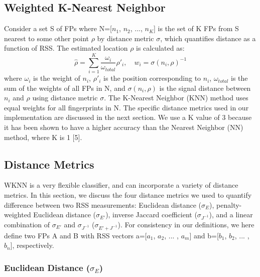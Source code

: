 \documentclass[conference]{IEEEtran}
\begin{document}
\subsection{Weighted K-Nearest Neighbor}
\indent Consider a set S of FPs  where N=[$n_1$, $n_2$, ..., $n_K$] is the set of K FPs from S nearest to some other point $\rho$ by distance metric $\sigma$, which quantifies distance as a function of RSS. The estimated location $\rho$ is calculated as:
\begin{equation}
\label{wknn}
\hat{\rho} = \sum\limits_{i=1}^{K}\frac{\omega_i}{\omega_{total}}\rho'_i, \quad w_i = \sigma(n_i, \rho)^{-1}
\end{equation}
where $\omega_i$ is the weight of $n_i$, $\rho'_i$ is the position corresponding to $n_i$, $\omega_{total}$ is the sum of the weights of all FPs in N, and $\sigma(n_i, \rho)$ is the signal distance between $n_i$ and $\rho$ using distance metric $\sigma$. The K-Nearest Neighbor (KNN) method uses equal weights for all fingerprints in N. The specific distance metrics used in our implementation are discussed in the next section. We use a K value of 3 because it has been shown to have a higher accuracy than the Nearest Neighbor (NN) method, where K is 1 [5]. 

\subsection{Distance Metrics}
WKNN is a very flexible classifier, and can incorporate a variety of distance metrics. In this section, we discuss the four distance metrics we used to quantify difference between two RSS measurements: Euclidean distance ($\sigma_E$), penalty-weighted Euclidean distance ($\sigma_{E'}$), inverse Jaccard coefficient ($\sigma_{J^{-1}}$), and a linear combination of $\sigma_{E'}$ and $\sigma_{J^{-1}}$ ($\sigma_{E' + J^{-1}}$). For consistency in our definitions, we here define two FPs A and B with RSS vectors a=[$a_1$, $a_2$, ... , $a_m$] and b=[$b_1$, $b_2$, ... , $b_n$], respectively. 

\subsubsection{Euclidean Distance ($\sigma_E$)}
\end{document}
